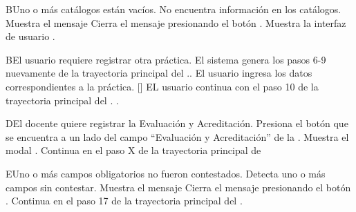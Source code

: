 
\begin{UCtrayectoriaA}{B}{Uno o más catálogos están vacíos.}
	\UCpaso No encuentra información en los catálogos.
    \UCpaso Muestra el mensaje 
    \UCpaso[\UCactor] Cierra el mensaje presionando el botón .
	\UCpaso Muestra la interfaz de usuario .
\end{UCtrayectoriaA}


\begin{UCtrayectoriaA}{B}{El usuario requiere registrar otra práctica.}
    \UCpaso El sistema genera los pasos 6-9 nuevamente de la trayectoria principal del ..
    \UCpaso[\UCactor] El usuario ingresa los datos correspondientes a la práctica.
    \UCpaso{}[\UCactor] EL usuario continua con el paso 10 de la trayectoria principal del .
    .
\end{UCtrayectoriaA}


\begin{UCtrayectoriaA}{D}{El docente quiere registrar la Evaluación y Acreditación.}
	\UCpaso[\UCactor] Presiona el botón \BtnModal que se encuentra a un lado del campo ``Evaluación y Acreditación'' de la .
	\UCpaso Muestra el modal .
	\UCpaso Continua en el paso X de la trayectoria principal de 
\end{UCtrayectoriaA}


\begin{UCtrayectoriaA}{E}{Uno o más campos obligatorios no fueron contestados.}
	\UCpaso Detecta uno o más campos sin contestar.
    \UCpaso Muestra el mensaje 
    \UCpaso[\UCactor] Cierra el mensaje presionando el botón .
    \UCpaso Continua en el paso 17 de la trayectoria principal del .
\end{UCtrayectoriaA}